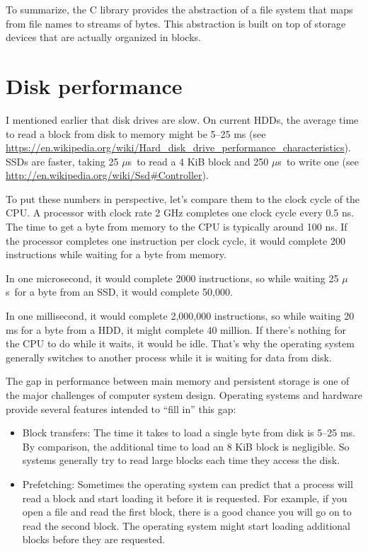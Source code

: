 \documentclass[12pt]{book}
\begin{document}
{To summarize, the C library provides the abstraction of a file
system that maps from file names to streams of bytes.  This abstraction
is built on top of storage devices that are actually organized
in blocks.


\section{Disk performance}

\newcommand{\mus}{$\mu$s~}

I mentioned earlier that disk drives are slow.  On current HDDs, the
average time to read a block from disk to memory might be 5--25 ms
(see \url{https://en.wikipedia.org/wiki/Hard_disk_drive_performance_characteristics}).
SSDs are faster, taking 25 \mus to read a 4 KiB block and 250 \mus to
write one (see \url{http://en.wikipedia.org/wiki/Ssd#Controller}).

To put these numbers in perspective, let's compare them to the clock
cycle of the CPU.  A processor with clock rate 2 GHz completes one
clock cycle every 0.5 ns.  The time to get a byte from memory to
the CPU is typically around 100 ns.  If the processor completes one
instruction per clock cycle, it would complete 200 instructions
while waiting for a byte from memory.

In one microsecond, it would complete 2000 instructions,
so while waiting 25 \mus for a byte from an SSD, it would complete 50,000.

In one millisecond, it would complete 2,000,000 instructions,
so while waiting 20 ms for a byte from a HDD, it might complete
40 million.  If there's nothing for the CPU to do while it waits,
it would be idle.  That's why the operating system generally
switches to another process while it is waiting for data from disk.

The gap in performance between main memory and persistent storage is
one of the major challenges of computer system design.  Operating
systems and hardware provide several features intended to ``fill in''
this gap:

\begin{itemize}

\item Block transfers: The time it takes to load a single byte from
  disk is 5--25 ms.  By comparison, the additional time to load an 8
  KiB block is negligible.  So systems generally try to read large
  blocks each time they access the disk.

\item Prefetching: Sometimes the operating system can predict that a
  process will read a block and start loading it before it is
  requested.  For example, if you open a file and read the first
  block, there is a good chance you will go on to read the second
  block.  The operating system might start loading additional blocks
  before they are requested.


\end{itemize}}
\end{document}
